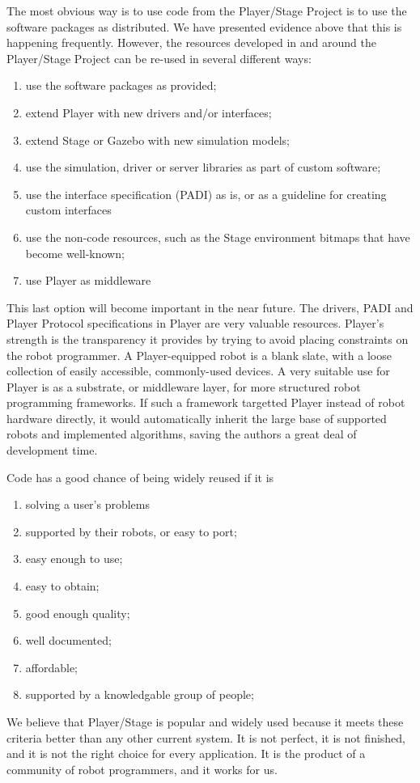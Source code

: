 The most obvious way is to use code from the Player/Stage Project is
to use the software packages as distributed. We have presented
evidence above that this is happening frequently. However, the
resources developed in and around the Player/Stage Project can be
re-used in several different ways:

\begin{enumerate}
\item use the software packages as provided;
\item extend Player with new drivers and/or interfaces;
\item extend Stage or Gazebo with new simulation models;
\item use the simulation, driver or server libraries as part of custom software;
\item use the interface specification (PADI) as is, or as a guideline for creating custom interfaces
\item use the non-code resources, such as the Stage environment bitmaps that have become well-known;
\item use Player as middleware
\end{enumerate}

This last option will become important in the near future. The
drivers, PADI and Player Protocol specifications in Player are very
valuable resources. Player's strength is the transparency it provides
by trying to avoid placing constraints on the robot programmer. A
Player-equipped robot is a blank slate, with a loose collection of
easily accessible, commonly-used devices. A very suitable use for
Player is as a substrate, or middleware layer, for more structured
robot programming frameworks. If such a framework targetted Player
instead of robot hardware directly, it would automatically inherit the
large base of supported robots and implemented algorithms, saving the
authors a great deal of development time.

Code has a good chance of being widely reused if it is

\begin{enumerate}
\item solving a user's problems
\item supported by their robots, or easy to port;
\item easy enough to use;
\item easy to obtain;
\item good enough quality;
\item well documented;
\item affordable;
\item supported by a knowledgable group of people;
\end{enumerate}

We believe that Player/Stage is popular and widely used because it
meets these criteria better than any other current system. It is not
perfect, it is not finished, and it is not the right choice for every
application. It is the product of a community of robot programmers,
and it works for us.





